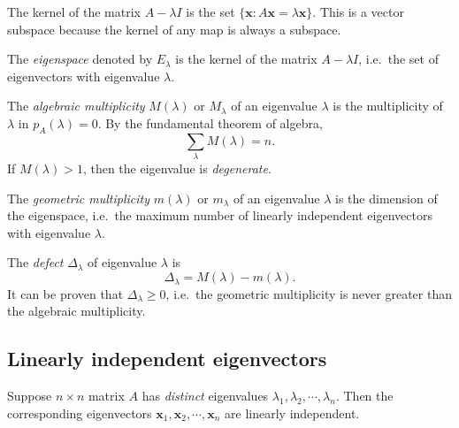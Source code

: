 \documentclass[a4paper]{article}
\begin{document}
The kernel of the matrix $A - \lambda I$ is the set $\{\mathbf{x}: A\mathbf{x} = \lambda\mathbf{x}\}$. This is a vector subspace because the kernel of any map is always a subspace.

\begin{defi}[Eigenspace]
  The \emph{eigenspace} denoted by $E_\lambda$ is the kernel of the matrix $A - \lambda I$, i.e.\ the set of eigenvectors with eigenvalue $\lambda$.
\end{defi}

\begin{defi}
  The \emph{algebraic multiplicity} $M(\lambda)$ or $M_\lambda$ of an eigenvalue $\lambda$ is the multiplicity of $\lambda$ in $p_A(\lambda) = 0$. By the fundamental theorem of algebra,
  \[
    \sum_\lambda M(\lambda) = n.
  \]
  If $M(\lambda) > 1$, then the eigenvalue is \emph{degenerate}.
\end{defi}

\begin{defi}
  The \emph{geometric multiplicity} $m(\lambda)$ or $m_\lambda$ of an eigenvalue $\lambda$ is the dimension of the eigenspace, i.e.\ the maximum number of linearly independent eigenvectors with eigenvalue $\lambda$.
\end{defi}

\begin{defi}
  The \emph{defect} $\Delta_\lambda$ of eigenvalue $\lambda$ is
  \[
    \Delta_\lambda = M(\lambda) - m(\lambda).
  \]
  It can be proven that $\Delta_\lambda \geq 0$, i.e.\ the geometric multiplicity is never greater than the algebraic multiplicity.
\end{defi}

\subsection{Linearly independent eigenvectors}
\begin{thm}
  Suppose $n\times n$ matrix $A$ has \emph{distinct} eigenvalues $\lambda_1, \lambda_2, \cdots, \lambda_n$. Then the corresponding eigenvectors $\mathbf{x}_1, \mathbf{x}_2, \cdots, \mathbf{x}_n$ are linearly independent.
\end{thm}
\end{document}
